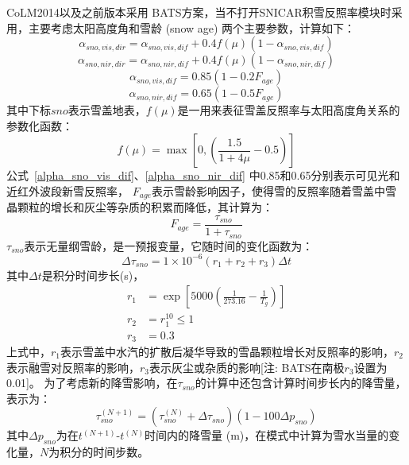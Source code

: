 CoLM2014以及之前版本采用 \citet{dickinson1986biosphere} BATS方案，当不打开SNICAR积雪反照率模块时采用，主要考虑太阳高度角和雪龄 (snow age) 两个主要参数，计算如下：
\begin{equation}
\alpha_{sno, vis, dir}=\alpha_{sno, vis, dif}+0.4 f(\mu)\left(1-\alpha_{sno, vis, dif}\right)
\end{equation}
%
\begin{equation}
\alpha_{sno,nir,dir}=\alpha_{sno, nir, dif}+0.4 f(\mu)\left(1-\alpha_{sno,nir,dif}\right)
\end{equation} 
%
\begin{equation}\label{alpha_sno_vis_dif}
\alpha_{sno,vis,dif}=0.85\left(1-0.2 F_{age}\right)
\end{equation}
%
\begin{equation}\label{alpha_sno_nir_dif}
\alpha_{sno,nir,dif}=0.65\left(1-0.5 F_{age}\right)
\end{equation}
其中下标$sno$表示雪盖地表，$f(\mu)$是一用来表征雪盖反照率与太阳高度角关系的参数化函数：
\begin{equation}\label{fmu}
f(\mu)=\max\left[0,\left(\frac{1.5}{1+4 \mu}-0.5\right)\right]
\end{equation}
公式~\eqref{alpha_sno_vis_dif}、\eqref{alpha_sno_nir_dif} 中0.85和0.65分别表示可见光和近红外波段新雪反照率，
$F_{age}$表示雪龄影响因子，使得雪的反照率随着雪盖中雪晶颗粒的增长和灰尘等杂质的积累而降低，其计算为：
\begin{equation}
F_{a g e}=\frac{\tau_{sno}}{1+\tau_{sno}}
\end{equation}
$\tau_{sno}$表示无量纲雪龄，是一预报变量，它随时间的变化函数为：
\begin{equation}
\Delta \tau_{sno}=1 \times 10^{-6}\left(r_{1}+r_{2}+r_{3}\right) \Delta t
\end{equation}
其中$\Delta t$是积分时间步长(s)，
\begin{align}
r_{1} &= \exp \left[5000\left(\frac{1}{273.16}-\frac{1}{T_{g}}\right)\right] \\
r_{2} &= r_{1}^{10} \leqslant 1 \\
r_{3} &= 0.3
\end{align}
上式中，$r_1$表示雪盖中水汽的扩散后凝华导致的雪晶颗粒增长对反照率的影响，$r_2$表示融雪对反照率的影响，$r_3$表示灰尘或杂质的影响[注: BATS在南极$r_3$设置为0.01]。
为了考虑新的降雪影响，在$\tau_{sno}$的计算中还包含计算时间步长内的降雪量，表示为：
\begin{equation}
\tau_{sno}^{(N+1)}=\left(\tau_{sno}^{(N)}+\Delta \tau_{sno}\right)\left(1-100 \Delta p_{sno}\right)
\end{equation}
其中$\Delta p_{sno}$为在$t^{(N+1)}$-$t^{(N)}$时间内的降雪量 (m)，在模式中计算为雪水当量的变化量，$N$为积分的时间步数。



